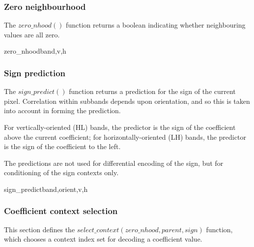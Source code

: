 \subsubsection{Zero neighbourhood}
\label{zeronhood}

The $zero\_nhood()$ function returns a boolean indicating whether neighbouring
values are all zero.

\begin{pseudo}{zero\_nhood}{band,v,h}
    \bsRET{\false}
  \bsEND
      \bsRET{\false}
    \bsEND
  \bsEND
\bsELSE
      \bsRET{\false}
    \bsEND
  \bsEND
\bsEND
\bsRET{\true}
\end{pseudo}

\subsubsection{Sign prediction}
\label{signpredict}

The $sign\_predict()$ function returns a prediction for the sign of the 
current pixel. Correlation within subbands depends upon orientation,
and so this is taken into account in forming the prediction.

For vertically-oriented (HL) bands, the predictor is the sign of the
coefficient above the current coefficient; for horizontally-oriented (LH)
bands, the predictor is the sign of the coefficient to the left. 

The predictions are not used for differential encoding of the sign, but for
conditioning of the sign contexts only.

\begin{pseudo}{sign\_predict}{band,orient,v,h}
  \bsELSE
  \bsEND
{}
  \bsELSE
  \bsEND
\bsELSE
\bsEND{}
\end{pseudo}

\subsubsection{Coefficient context selection}
\label{selectcoeffcontext}

This section defines the $select\_context(zero\_nhood, parent, sign)$
function, which chooses a context index set for decoding a coefficient value.


